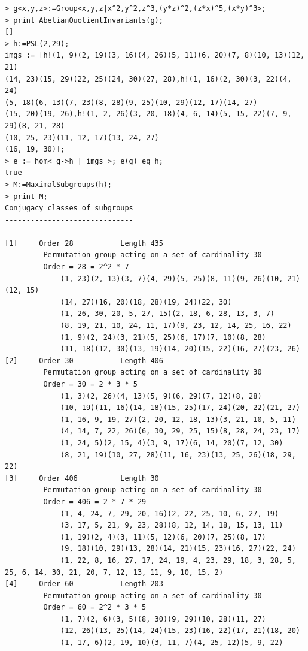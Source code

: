 \documentclass[11pt]{amsart}
\numberwithin{equation}{section}
\begin{document}
\medskip

\begin{verbatim}
> g<x,y,z>:=Group<x,y,z|x^2,y^2,z^3,(y*z)^2,(z*x)^5,(x*y)^3>;
> print AbelianQuotientInvariants(g);
[]
> h:=PSL(2,29);
imgs := [h!(1, 9)(2, 19)(3, 16)(4, 26)(5, 11)(6, 20)(7, 8)(10, 13)(12, 21)
(14, 23)(15, 29)(22, 25)(24, 30)(27, 28),h!(1, 16)(2, 30)(3, 22)(4, 24)
(5, 18)(6, 13)(7, 23)(8, 28)(9, 25)(10, 29)(12, 17)(14, 27)
(15, 20)(19, 26),h!(1, 2, 26)(3, 20, 18)(4, 6, 14)(5, 15, 22)(7, 9, 29)(8, 21, 28)
(10, 25, 23)(11, 12, 17)(13, 24, 27)
(16, 19, 30)];
> e := hom< g->h | imgs >; e(g) eq h;
true
> M:=MaximalSubgroups(h);
> print M;
Conjugacy classes of subgroups
------------------------------

[1]     Order 28           Length 435
         Permutation group acting on a set of cardinality 30
         Order = 28 = 2^2 * 7
             (1, 23)(2, 13)(3, 7)(4, 29)(5, 25)(8, 11)(9, 26)(10, 21)(12, 15)
             (14, 27)(16, 20)(18, 28)(19, 24)(22, 30)
             (1, 26, 30, 20, 5, 27, 15)(2, 18, 6, 28, 13, 3, 7)
             (8, 19, 21, 10, 24, 11, 17)(9, 23, 12, 14, 25, 16, 22)
             (1, 9)(2, 24)(3, 21)(5, 25)(6, 17)(7, 10)(8, 28)
             (11, 18)(12, 30)(13, 19)(14, 20)(15, 22)(16, 27)(23, 26)
[2]     Order 30           Length 406
         Permutation group acting on a set of cardinality 30
         Order = 30 = 2 * 3 * 5
             (1, 3)(2, 26)(4, 13)(5, 9)(6, 29)(7, 12)(8, 28)
             (10, 19)(11, 16)(14, 18)(15, 25)(17, 24)(20, 22)(21, 27)
             (1, 16, 9, 19, 27)(2, 20, 12, 18, 13)(3, 21, 10, 5, 11)
             (4, 14, 7, 22, 26)(6, 30, 29, 25, 15)(8, 28, 24, 23, 17)
             (1, 24, 5)(2, 15, 4)(3, 9, 17)(6, 14, 20)(7, 12, 30)
             (8, 21, 19)(10, 27, 28)(11, 16, 23)(13, 25, 26)(18, 29, 22)
[3]     Order 406          Length 30
         Permutation group acting on a set of cardinality 30
         Order = 406 = 2 * 7 * 29
             (1, 4, 24, 7, 29, 20, 16)(2, 22, 25, 10, 6, 27, 19)
             (3, 17, 5, 21, 9, 23, 28)(8, 12, 14, 18, 15, 13, 11)
             (1, 19)(2, 4)(3, 11)(5, 12)(6, 20)(7, 25)(8, 17)
             (9, 18)(10, 29)(13, 28)(14, 21)(15, 23)(16, 27)(22, 24)
             (1, 22, 8, 16, 27, 17, 24, 19, 4, 23, 29, 18, 3, 28, 5, 
25, 6, 14, 30, 21, 20, 7, 12, 13, 11, 9, 10, 15, 2)
[4]     Order 60           Length 203
         Permutation group acting on a set of cardinality 30
         Order = 60 = 2^2 * 3 * 5
             (1, 7)(2, 6)(3, 5)(8, 30)(9, 29)(10, 28)(11, 27)
             (12, 26)(13, 25)(14, 24)(15, 23)(16, 22)(17, 21)(18, 20)
             (1, 17, 6)(2, 19, 10)(3, 11, 7)(4, 25, 12)(5, 9, 22)

\end{verbatim}
\end{document}
